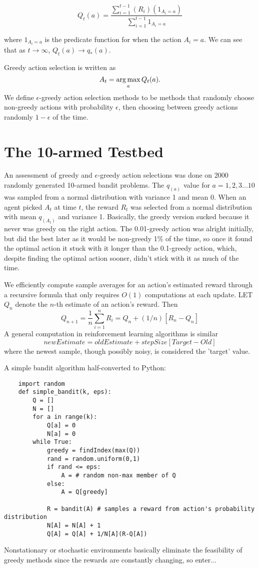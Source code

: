 \documentclass[a4paper]{report}
\begin{document}
$$Q_t(a) = \frac{\sum_{i=1}^{t-1}(R_i)(1_{A_i=a})}{\sum_{i=1}^{t-1}1_{A_i=a}}$$

where $1_{A_i=a}$ is the predicate function for when the action $A_i = a$. We can see that as $t \rightarrow \infty$, $Q_t(a) \rightarrow q_{\ast}(a)$.

Greedy action selection is written as $$A_t = \operatorname*{arg\,max}_a Q_t(a).$$ We define $\epsilon$-greedy action selection methods to be methods that randomly choose non-greedy actions with probability $\epsilon$, then choosing between greedy actions randomly $1 - \epsilon$ of the time.

\section{The 10-armed Testbed}
An assessment of greedy and $\epsilon$-greedy action selections was done on 2000 randomly generated 10-armed bandit problems. The $q_(a)$ value for $a = 1, 2,3...10$ was sampled from a normal distribution with variance 1 and mean 0. When an agent picked $A_t$ at time $t$, the reward $R_t$ was selected from a normal distribution with mean $q_(A_t)$ and variance 1. Basically, the greedy version sucked because it never was greedy on the right action. The 0.01-greedy action was alright initially, but did the best later as it would be non-greedy 1\% of the time, so once it found the optimal action it stuck with it longer than the 0.1-greedy action, which, despite finding the optimal action sooner, didn't stick with it as much of the time.

We efficiently compute sample averages for an action's estimated reward through a recursive formula that only requires $O(1)$ computations at each update. LET $Q_n$ denote the $n$-th estimate of an action's reward. Then $$Q_{n+1} = \frac{1}{n}\sum_{i=1}^{n}R_i = Q_n + (1/n)[R_n-Q_n]$$ A general computation in reinforcement learning algorithms is similar $$newEstimate = oldEstimate + stepSize[Target-Old]$$ where the newest sample, though possibly noisy, is considered the 'target' value.

\newpage

A simple bandit algorithm half-converted to Python:
\begin{verbatim}
    import random
    def simple_bandit(k, eps):
        Q = []
        N = []
        for a in range(k):
            Q[a] = 0
            N[a] = 0
        while True:
            greedy = findIndex(max(Q))
            rand = random.uniform(0,1)
            if rand <= eps:
                A = # random non-max member of Q
            else:
                A = Q[greedy]

            R = bandit(A) # samples a reward from action's probability distribution
            N[A] = N[A] + 1
            Q[A] = Q[A] + 1/N[A](R-Q[A])  
\end{verbatim}
Nonstationary or stochastic environments basically eliminate the feasibility of greedy methods since the rewards are constantly changing, so enter...
\end{document}
